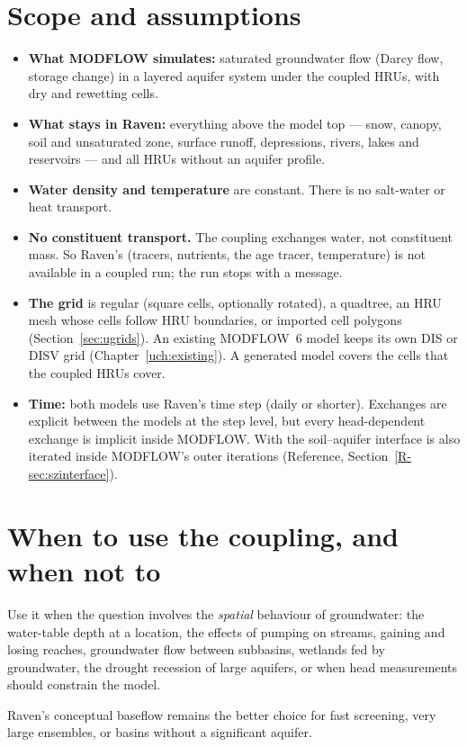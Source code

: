 \section{Scope and assumptions}
\begin{itemize}
\item \textbf{What MODFLOW simulates:} saturated groundwater flow (Darcy flow, storage change) in a layered aquifer
system under the coupled HRUs, with dry and rewetting cells.
\item \textbf{What stays in Raven:} everything above the model top --- snow, canopy, soil and unsaturated zone, surface
runoff, depressions, rivers, lakes and reservoirs --- and all HRUs without an aquifer profile.
\item \textbf{Water density and temperature} are constant. There is no salt-water or heat transport.
\item \textbf{No constituent transport.} The coupling exchanges water, not constituent mass. So Raven's 
(tracers, nutrients, the age tracer, temperature) is not available in a coupled run; the run stops with a message.
\item \textbf{The grid} is regular (square cells, optionally rotated), a quadtree, an HRU mesh whose cells follow HRU
boundaries, or imported cell polygons (Section~\ref{sec:ugrids}). An existing MODFLOW~6 model keeps its own DIS or DISV
grid (Chapter~\ref{uch:existing}). A generated model covers the cells that the coupled HRUs cover.
\item \textbf{Time:} both models use Raven's time step (daily or shorter). Exchanges are explicit between the models at
the step level, but every head-dependent exchange is implicit inside MODFLOW. With  the
soil--aquifer interface is also iterated inside MODFLOW's outer iterations (Reference, Section~\ref{R-sec:szinterface}).
\end{itemize}

\section{When to use the coupling, and when not to}
Use it when the question involves the \emph{spatial} behaviour of groundwater: the water-table depth at a location, the
effects of pumping on streams, gaining and losing reaches, groundwater flow between subbasins, wetlands fed by
groundwater, the drought recession of large aquifers, or when head measurements should constrain the model.

Raven's conceptual baseflow remains the better choice for fast screening, very large ensembles, or basins without a
significant aquifer.

